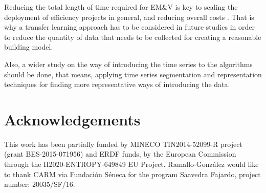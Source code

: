 \documentclass[10pt, conference, compsocconf]{IEEEtran}
\begin{document}
Reducing the total length of time required for EM\&V is key to scaling the deployment of efficiency projects in general, and reducing overall costs \cite{granderson2015automated}. That is why a transfer learning approach has to be considered in future studies in order to reduce the quantity of data that needs to be collected for creating a reasonable building model.

Also, a wider study on the way of introducing the time series to the algorithms should be done, that means, applying time series segmentation and representation techniques for finding more representative ways of introducing the data. 


\section*{Acknowledgements}

This work has been partially funded by MINECO TIN2014-52099-R project (grant BES-2015-071956) and ERDF funds, by the European Commission through the H2020-ENTROPY-649849 EU Project. Ramallo-González would like to thank CARM via Fundación Séneca for the program Saavedra Fajardo, project number: 20035/SF/16.


%
%

\end{document}
